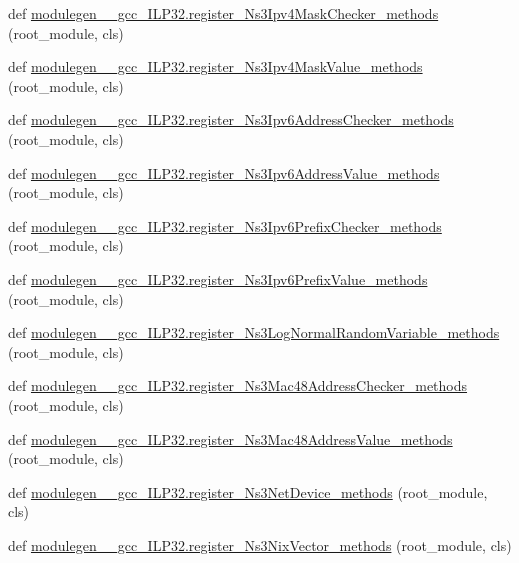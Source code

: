 \begin{DoxyCompactItemize}
\item 
def \hyperlink{namespacemodulegen____gcc__ILP32_a0c8c90b61f4e832ecf41510f18e20e98}{modulegen\+\_\+\+\_\+gcc\+\_\+\+I\+L\+P32.\+register\+\_\+\+Ns3\+Ipv4\+Mask\+Checker\+\_\+methods} (root\+\_\+module, cls)
\item 
def \hyperlink{namespacemodulegen____gcc__ILP32_aa0677871460e65b32fe90ab9bef43b9f}{modulegen\+\_\+\+\_\+gcc\+\_\+\+I\+L\+P32.\+register\+\_\+\+Ns3\+Ipv4\+Mask\+Value\+\_\+methods} (root\+\_\+module, cls)
\item 
def \hyperlink{namespacemodulegen____gcc__ILP32_aed7bbb9a518f22e7091964769eb4c4d3}{modulegen\+\_\+\+\_\+gcc\+\_\+\+I\+L\+P32.\+register\+\_\+\+Ns3\+Ipv6\+Address\+Checker\+\_\+methods} (root\+\_\+module, cls)
\item 
def \hyperlink{namespacemodulegen____gcc__ILP32_a94efe88582382700df8f33c69780357b}{modulegen\+\_\+\+\_\+gcc\+\_\+\+I\+L\+P32.\+register\+\_\+\+Ns3\+Ipv6\+Address\+Value\+\_\+methods} (root\+\_\+module, cls)
\item 
def \hyperlink{namespacemodulegen____gcc__ILP32_a98ee840f5ce1609ca10ebe6eb1022047}{modulegen\+\_\+\+\_\+gcc\+\_\+\+I\+L\+P32.\+register\+\_\+\+Ns3\+Ipv6\+Prefix\+Checker\+\_\+methods} (root\+\_\+module, cls)
\item 
def \hyperlink{namespacemodulegen____gcc__ILP32_a0b720f36ae3a4e1b9a79eba05de63e4a}{modulegen\+\_\+\+\_\+gcc\+\_\+\+I\+L\+P32.\+register\+\_\+\+Ns3\+Ipv6\+Prefix\+Value\+\_\+methods} (root\+\_\+module, cls)
\item 
def \hyperlink{namespacemodulegen____gcc__ILP32_a4f3a1c9e4d2390051bc66d0321f466e5}{modulegen\+\_\+\+\_\+gcc\+\_\+\+I\+L\+P32.\+register\+\_\+\+Ns3\+Log\+Normal\+Random\+Variable\+\_\+methods} (root\+\_\+module, cls)
\item 
def \hyperlink{namespacemodulegen____gcc__ILP32_a9a21f6afbd8086013a32b274dbadbbfe}{modulegen\+\_\+\+\_\+gcc\+\_\+\+I\+L\+P32.\+register\+\_\+\+Ns3\+Mac48\+Address\+Checker\+\_\+methods} (root\+\_\+module, cls)
\item 
def \hyperlink{namespacemodulegen____gcc__ILP32_acd3d4984a8cfb1ebfef0f6abc746e62c}{modulegen\+\_\+\+\_\+gcc\+\_\+\+I\+L\+P32.\+register\+\_\+\+Ns3\+Mac48\+Address\+Value\+\_\+methods} (root\+\_\+module, cls)
\item 
def \hyperlink{namespacemodulegen____gcc__ILP32_a88fafb58aa743dae1a3acfbbb6787697}{modulegen\+\_\+\+\_\+gcc\+\_\+\+I\+L\+P32.\+register\+\_\+\+Ns3\+Net\+Device\+\_\+methods} (root\+\_\+module, cls)
\item 
def \hyperlink{namespacemodulegen____gcc__ILP32_a9b2d434ab0f4ea1d861923f9a09be052}{modulegen\+\_\+\+\_\+gcc\+\_\+\+I\+L\+P32.\+register\+\_\+\+Ns3\+Nix\+Vector\+\_\+methods} (root\+\_\+module, cls)

\end{DoxyCompactItemize}

